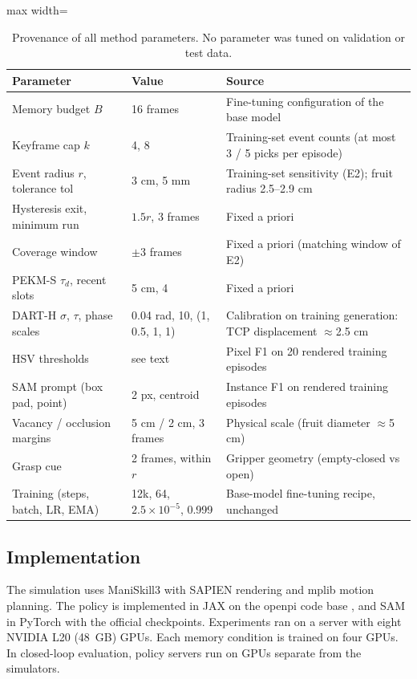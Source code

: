 \begin{table}[t]
\centering
\caption{Provenance of all method parameters. No parameter was tuned on validation or test data.}
\label{tab:provenance}
\footnotesize
\begin{adjustbox}{max width=\textwidth}\begin{tabular}{p{4.2cm}p{2.6cm}p{5.4cm}}
\toprule
Parameter & Value & Source\\
\midrule
Memory budget $B$ & 16 frames & Fine-tuning configuration of the base model\\
Keyframe cap $k$ & 4, 8 & Training-set event counts (at most 3 / 5 picks per episode)\\
Event radius $r$, tolerance tol & 3 cm, 5 mm & Training-set sensitivity (E2); fruit radius 2.5--2.9 cm\\
Hysteresis exit, minimum run & $1.5r$, 3 frames & Fixed a priori\\
Coverage window & $\pm3$ frames & Fixed a priori (matching window of E2)\\
PEKM-S $\tau_d$, recent slots & 5 cm, 4 & Fixed a priori\\
DART-H $\sigma$, $\tau$, phase scales & 0.04 rad, 10, (1, 0.5, 1, 1) & Calibration on training generation: TCP displacement $\approx$2.5 cm\\
HSV thresholds & see text & Pixel F1 on 20 rendered training episodes\\
SAM prompt (box pad, point) & 2 px, centroid & Instance F1 on rendered training episodes\\
Vacancy / occlusion margins & 5 cm / 2 cm, 3 frames & Physical scale (fruit diameter $\approx$5 cm)\\
Grasp cue & 2 frames, within $r$ & Gripper geometry (empty-closed vs open)\\
Training (steps, batch, LR, EMA) & 12k, 64, $2.5\times10^{-5}$, 0.999 & Base-model fine-tuning recipe, unchanged\\
\bottomrule
\end{tabular}\end{adjustbox}
\end{table}

\subsection{Implementation}
The simulation uses ManiSkill3 \citep{tao2025maniskill3} with SAPIEN rendering and mplib \citep{mplib} motion planning. The policy is implemented in JAX on the openpi code base \citep{black2024pi0}, and SAM in PyTorch with the official checkpoints. Experiments ran on a server with eight NVIDIA L20 (48~GB) GPUs. Each memory condition is trained on four GPUs. In closed-loop evaluation, policy servers run on GPUs separate from the simulators.
